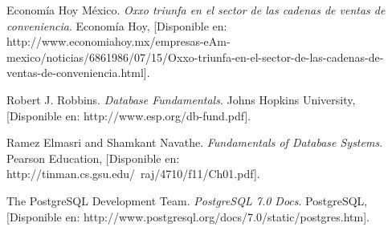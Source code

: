 \documentclass[spanish,12pt,letterpapper]{article}
\begin{document}
	\pagebreak
	\begin{thebibliography}{9}
	 Economía Hoy México. 
		\emph{Oxxo triunfa en el sector de las cadenas de ventas de conveniencia}. Economía Hoy, [Disponible en: http://www.economiahoy.mx/empresas-eAm-mexico/noticias/6861986/07/15/Oxxo-triunfa-en-el-sector-de-las-cadenas-de-ventas-de-conveniencia.html].
		
		 Robert J. Robbins. 
		\emph{Database Fundamentals}. Johns Hopkins University, [Disponible en: http://www.esp.org/db-fund.pdf].
		
		 Ramez Elmasri and Shamkant Navathe. 
		\emph{Fundamentals of Database Systems}. Pearson Education, [Disponible en: http://tinman.cs.gsu.edu/~raj/4710/f11/Ch01.pdf].
		
		 The PostgreSQL Development Team. 
		\emph{PostgreSQL 7.0 Docs}. PostgreSQL, [Disponible en: http://www.postgresql.org/docs/7.0/static/postgres.htm].
		

	\end{thebibliography}
\end{document}
